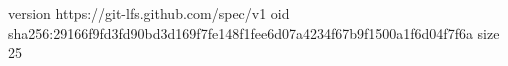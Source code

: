 version https://git-lfs.github.com/spec/v1
oid sha256:29166f9fd3fd90bd3d169f7fe148f1fee6d07a4234f67b9f1500a1f6d04f7f6a
size 25
